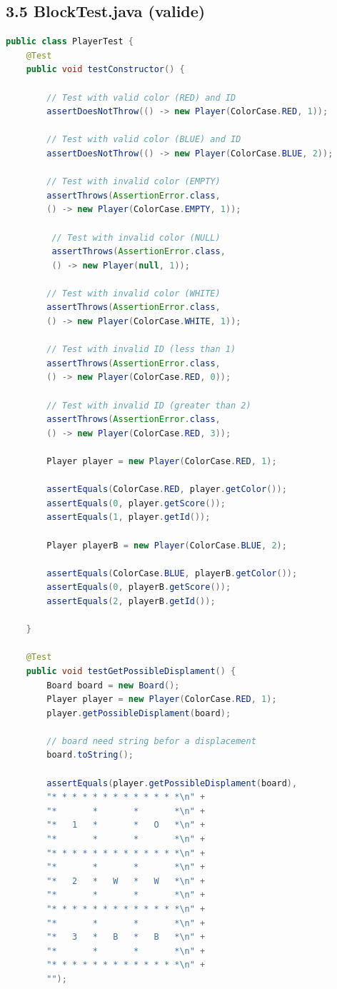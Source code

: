 \documentclass[a4paper,11pt]{article}
\begin{document}
\subsection{3.5 BlockTest.java (valide)}

\begin{lstlisting}[language=Java]
public class PlayerTest {
    @Test
    public void testConstructor() {

        // Test with valid color (RED) and ID
        assertDoesNotThrow(() -> new Player(ColorCase.RED, 1));

        // Test with valid color (BLUE) and ID
        assertDoesNotThrow(() -> new Player(ColorCase.BLUE, 2));

        // Test with invalid color (EMPTY)
        assertThrows(AssertionError.class, 
        () -> new Player(ColorCase.EMPTY, 1));

         // Test with invalid color (NULL)
         assertThrows(AssertionError.class, 
         () -> new Player(null, 1));

        // Test with invalid color (WHITE)
        assertThrows(AssertionError.class, 
        () -> new Player(ColorCase.WHITE, 1));

        // Test with invalid ID (less than 1)
        assertThrows(AssertionError.class, 
        () -> new Player(ColorCase.RED, 0));

        // Test with invalid ID (greater than 2)
        assertThrows(AssertionError.class, 
        () -> new Player(ColorCase.RED, 3));

        Player player = new Player(ColorCase.RED, 1);

        assertEquals(ColorCase.RED, player.getColor());
        assertEquals(0, player.getScore());
        assertEquals(1, player.getId());

        Player playerB = new Player(ColorCase.BLUE, 2);

        assertEquals(ColorCase.BLUE, playerB.getColor());
        assertEquals(0, playerB.getScore());
        assertEquals(2, playerB.getId());

    }

    @Test
    public void testGetPossibleDisplament() {
        Board board = new Board();
        Player player = new Player(ColorCase.RED, 1);
        player.getPossibleDisplament(board);

        // board need string befor a displacement
        board.toString();

        assertEquals(player.getPossibleDisplament(board),  
        "* * * * * * * * * * * * *\n" + 
        "*       *       *       *\n" + 
        "*   1   *       *   O   *\n" + 
        "*       *       *       *\n" + 
        "* * * * * * * * * * * * *\n" + 
        "*       *       *       *\n" + 
        "*   2   *   W   *   W   *\n" + 
        "*       *       *       *\n" + 
        "* * * * * * * * * * * * *\n" + 
        "*       *       *       *\n" + 
        "*   3   *   B   *   B   *\n" + 
        "*       *       *       *\n" + 
        "* * * * * * * * * * * * *\n" + 
        "");


\end{lstlisting}
\end{document}
